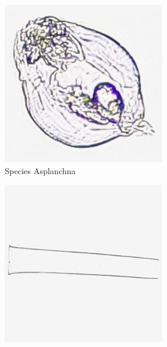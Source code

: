 \begin{figure}[H]
    \centering
    \begin{subfigure}[b]{0.32\linewidth}
        \centering
        \includegraphics[width=\linewidth]{examples/tests_eb/figs/plankton_examplebatch/asplanktia.png}
        \caption{Species Asplanchna}
        \label{fig:asplanch}
    \end{subfigure}
    \begin{subfigure}[b]{0.32\linewidth}
        \centering
        \includegraphics[width=\linewidth]{examples/tests_eb/figs/plankton_examplebatch/empty.jpg}

\end{subfigure}
\end{figure}
